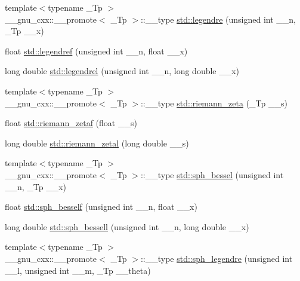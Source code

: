 \begin{DoxyCompactItemize}
\item 
{\footnotesize template$<$typename \+\_\+\+Tp $>$ }\\\+\_\+\+\_\+gnu\+\_\+cxx\+::\+\_\+\+\_\+promote$<$ \+\_\+\+Tp $>$\+::\+\_\+\+\_\+type \hyperlink{group__tr29124__math__spec__func_ga351a4a545c0e3f9e6ff5c0d4ff42d2e5}{std\+::legendre} (unsigned int \+\_\+\+\_\+n, \+\_\+\+Tp \+\_\+\+\_\+x)
\item 
float \hyperlink{group__tr29124__math__spec__func_ga83fc3b5f0ad76f4e6c3ccf13b1cacaae}{std\+::legendref} (unsigned int \+\_\+\+\_\+n, float \+\_\+\+\_\+x)
\item 
long double \hyperlink{group__tr29124__math__spec__func_gaeef497447af817a86522cd8f209d5291}{std\+::legendrel} (unsigned int \+\_\+\+\_\+n, long double \+\_\+\+\_\+x)
\item 
{\footnotesize template$<$typename \+\_\+\+Tp $>$ }\\\+\_\+\+\_\+gnu\+\_\+cxx\+::\+\_\+\+\_\+promote$<$ \+\_\+\+Tp $>$\+::\+\_\+\+\_\+type \hyperlink{group__tr29124__math__spec__func_ga67a6bfed9b6ab692e8c798b674431424}{std\+::riemann\+\_\+zeta} (\+\_\+\+Tp \+\_\+\+\_\+s)
\item 
float \hyperlink{group__tr29124__math__spec__func_gaf92063315061a56d3e2c4053156d968e}{std\+::riemann\+\_\+zetaf} (float \+\_\+\+\_\+s)
\item 
long double \hyperlink{group__tr29124__math__spec__func_ga1e92da3b878d75270f38d3ec9b513086}{std\+::riemann\+\_\+zetal} (long double \+\_\+\+\_\+s)
\item 
{\footnotesize template$<$typename \+\_\+\+Tp $>$ }\\\+\_\+\+\_\+gnu\+\_\+cxx\+::\+\_\+\+\_\+promote$<$ \+\_\+\+Tp $>$\+::\+\_\+\+\_\+type \hyperlink{group__tr29124__math__spec__func_ga478e517ed975bcb256de230e64f0fda5}{std\+::sph\+\_\+bessel} (unsigned int \+\_\+\+\_\+n, \+\_\+\+Tp \+\_\+\+\_\+x)
\item 
float \hyperlink{group__tr29124__math__spec__func_ga534e36e1dcefad8daec98920db16eec4}{std\+::sph\+\_\+besself} (unsigned int \+\_\+\+\_\+n, float \+\_\+\+\_\+x)
\item 
long double \hyperlink{group__tr29124__math__spec__func_ga11d72b1af81ce9da3c878a25087ee927}{std\+::sph\+\_\+bessell} (unsigned int \+\_\+\+\_\+n, long double \+\_\+\+\_\+x)
\item 
{\footnotesize template$<$typename \+\_\+\+Tp $>$ }\\\+\_\+\+\_\+gnu\+\_\+cxx\+::\+\_\+\+\_\+promote$<$ \+\_\+\+Tp $>$\+::\+\_\+\+\_\+type \hyperlink{group__tr29124__math__spec__func_ga573842c12247b87746b548f1945755a8}{std\+::sph\+\_\+legendre} (unsigned int \+\_\+\+\_\+l, unsigned int \+\_\+\+\_\+m, \+\_\+\+Tp \+\_\+\+\_\+theta)

\end{DoxyCompactItemize}
